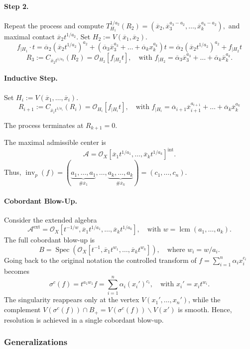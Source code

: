 \documentclass{amsart}
\newcommand{\ext}{{\operatorname{ext}}}
\newcommand{\Spec}{\operatorname{Spec}}
\newcommand{\lcm}{{\operatorname{lcm}}}
\renewcommand{\setminus}{\smallsetminus}
\newcommand{\inv}{{\operatorname{inv}}}
\begin{document}
\begin{example}
\paragraph{\bf Step 2.} Repeat the process and compute
$T^{1/a_2}_{H_1}(R_2)= (\overline{x}_2, \overline{x}_3^{a_3 - a_2}, \ldots, \overline{x}_k^{a_k - a_2}),$
and maximal contact $\overline{x}_2t^{1/a_2}$. Set  \( H_2 := V(\overline{x}_1,\overline{x}_2) \). $$ f_{|H_1}\cdot  t=\overline{\alpha}_2(\overline{x}_2t^{1/a_2})^{a_2}+(\overline{\alpha}_3\overline{x}_3^{a_3}+\ldots +\overline{\alpha}_kx_k^{a_k})t=\overline{\alpha}_2(\overline{x}_2t^{1/a_2})^{a_2}+ f_{|H_2} t$$
\[
R_3 := C_{\overline{x}_2 t^{1/a_2}}(R_2) = \mathcal{O}_{H_2}[ f_{|H_2} t],
\quad \text{with } f_{|H_2} = \overline{\alpha}_3\overline{x}_3^{{a}_3}+\ldots +\overline{\alpha}_k\overline{x}_k^{{a}_k}.
\]

\paragraph{\bf Inductive Step.}  Set $H_i:=V(\overline{x}_1,\ldots,\overline{x}_i)$.
 $$R_{i+1} := C_{\overline{x}_i t^{1/a_i}}(R_i) = \mathcal{O}_{H_i}[ f_{|H_i} t],\quad \text{with } f_{|H_i} = \overline{\alpha}_{i+1}\overline{x}_{i+1}^{{a}_{i+1}}+\ldots +\overline{\alpha}_k\overline{x}_k^{{a}_k}$$

The process terminates at $R_{k+1}=0$.

The maximal admissible center is 
\[
\mathcal{A} = \mathcal{O}_X[\overline{x}_1 t^{1/a_1}, \ldots, \overline{x}_k t^{1/a_k}]^{\text{int}} .
\]
Thus,  %
\( \inv_p(f) =  (\underbrace{a_1, \dots, a_1}_{\#\overline{x}_1}, \dots, \underbrace{a_k, \dots, a_k}_{\#\overline{x}_k})=(c_1, \ldots, c_n) \).

\paragraph{\bf Cobordant Blow-Up.} Consider the extended algebra
\[
\mathcal{A}^{\ext} = \mathcal{O}_X[t^{-1/w}, \overline{x}_1 t^{1/a_1}, \ldots, \overline{x}_k t^{1/a_k}],
\quad \text{with } w = \lcm(a_1, \ldots, a_k).
\]
The full cobordant blow-up is
\[
B = \Spec(\mathcal{O}_X[t^{-1}, \overline{x}_1 t^{w_1}, \ldots, \overline{x}_k t^{w_k}]),
\quad \text{where } w_i = w / a_i.
\]
Going back to the original notation the controlled transform of $f = \sum_{i=1}^n\alpha_i x_i^{c_i} $
becomes
\[
\sigma^c(f) = t^{a_1 w_1} f = \sum_{i=1}^n \alpha_i (x_i')^{c_i},
\quad \text{with } x_i' = x_i t^{w_i}.
\]
The singularity reappears only at the vertex \( V(x_1', \ldots, x_n') \), while the complement \( V(\sigma^c(f))\cap B_+ = V(\sigma^c(f)) \setminus V(x') \) is smooth. Hence, resolution is achieved in a single cobordant blow-up.
\end{example}\subsubsection{Generalizations}
\end{document}
